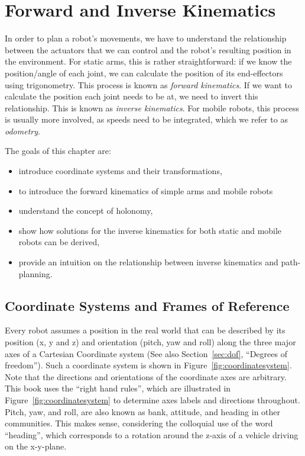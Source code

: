 \chapter{Forward and Inverse Kinematics}\label{chap:kinematics}
In order to plan a robot's movements, we have to understand the relationship between the actuators that we can control and the robot's resulting position in the environment. For static arms, this is rather straightforward: if we know the position/angle of each joint, we can calculate the position of its end-effectors using trigonometry. This process is known as \emph{forward kinematics}.  If we want to calculate the position each joint needs to be at, we need to invert this relationship. This is known as \emph{inverse kinematics}.  For mobile robots, this process is usually more involved, as speeds need to be integrated, which we refer to as \emph{odometry}.

The goals of this chapter are:

\begin{itemize}
\item introduce coordinate systems and their transformations,
\item to introduce the forward kinematics of simple arms and mobile robots
\item understand the concept of holonomy,
\item show how solutions for the inverse kinematics for both static and mobile robots can be derived,
\item provide an intuition on the relationship between inverse kinematics and path-planning.
\end{itemize}

\section{Coordinate Systems and Frames of Reference}\label{sec:coordsystems}
Every robot assumes a position in the real world that can be described by its position (x, y and z) and orientation (pitch, yaw and roll) along the three major axes of a Cartesian Coordinate system (See also Section~\ref{sec:dof}, ``Degrees of freedom''). Such a coordinate system is shown in Figure~\ref{fig:coordinatesystem}. Note that the directions and orientations of the coordinate axes are arbitrary. This book uses the ``right hand rules'', which are illustrated in Figure~\ref{fig:coordinatesystem} to determine axes labels and directions throughout. Pitch, yaw, and roll, are also known as bank, attitude, and heading in other communities.  This makes sense, considering the colloquial use of the word ``heading'', which corresponds to a rotation around the z-axis of a vehicle driving on the x-y-plane.


